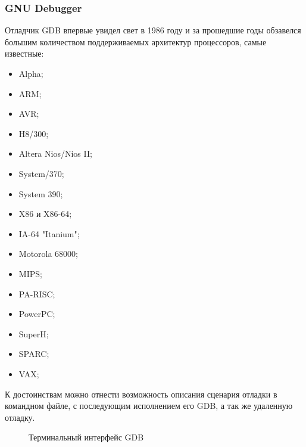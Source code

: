 \subsubsection{GNU Debugger}\label{sec:ch1/sec3/sub4/sub1}
Отладчик GDB впервые увидел свет в 1986 году и за прошедшие годы обзавелся
большим количеством поддерживаемых архитектур процессоров, самые известные:
\begin{itemize}
    \item Alpha;
    \item ARM;
    \item AVR;
    \item H8/300;
    \item Altera Nios/Nios II;
    \item System/370;
    \item System 390;
    \item X86 и X86-64;
    \item IA-64 "Itanium";
    \item Motorola 68000;
    \item MIPS;
    \item PA-RISC;
    \item PowerPC;
    \item SuperH;
    \item SPARC;
    \item VAX;
\end{itemize}
К достоинствам можно отнести возможность описания сценария отладки в командном файле,
с последующим исполнением его GDB, а так же удаленную отладку.
\begin{figure}[!htbp]
    \caption{Терминальный интерфейс GDB \label{fig:gdb-tui}}
\end{figure}

